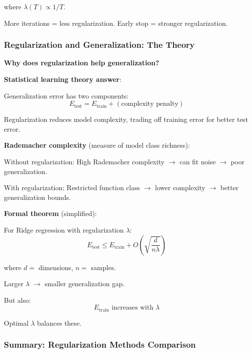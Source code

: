 where $\lambda(T) \propto 1/T$.

More iterations = less regularization. Early stop = stronger regularization.

\subsubsection{Regularization and Generalization: The Theory}

\textbf{Why does regularization help generalization?}

\textbf{Statistical learning theory answer}:

Generalization error has two components:
\begin{equation}
E_{\text{test}} = E_{\text{train}} + (\text{complexity penalty})
\end{equation}

Regularization reduces model complexity, trading off training error for better test error.

\textbf{Rademacher complexity} (measure of model class richness):

Without regularization: High Rademacher complexity $\rightarrow$ can fit noise $\rightarrow$ poor generalization.

With regularization: Restricted function class $\rightarrow$ lower complexity $\rightarrow$ better generalization bounds.

\textbf{Formal theorem} (simplified):

For Ridge regression with regularization $\lambda$:
\begin{equation}
E_{\text{test}} \leq E_{\text{train}} + O\left(\sqrt{\frac{d}{n\lambda}}\right)
\end{equation}

where $d =$ dimensions, $n =$ samples.

Larger $\lambda$ $\rightarrow$ smaller generalization gap.

But also:
\begin{equation}
E_{\text{train}} \text{ increases with } \lambda
\end{equation}

Optimal $\lambda$ balances these.

\subsubsection{Summary: Regularization Methods Comparison}

